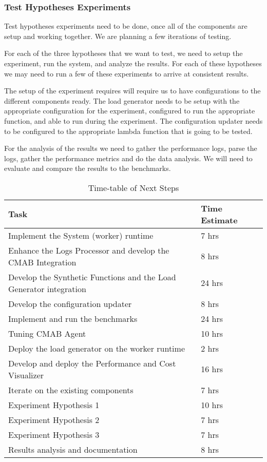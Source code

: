 \documentclass[conference]{IEEEtran}
\begin{document}
\subsubsection{Test Hypotheses Experiments}

Test hypotheses experiments need to be done, once all of the components are setup and working together. We are planning a few iterations of testing.

For each of the three hypotheses that we want to test, we need to setup the experiment, run the system, and analyze the results. For each of these hypotheses we may need to run a few of these experiments to arrive at consistent results.

The setup of the experiment requires will require us to have configurations to the different components ready. The load generator needs to be setup with the appropriate configuration for the experiment, configured to run the appropriate function, and able to run during the experiment. The configuration updater needs to be configured to the appropriate lambda function that is going to be tested.

For the analysis of the results we need to gather the performance logs, parse the logs, gather the performance metrics and do the data analysis. We will need to evaluate and compare the results to the benchmarks.

\begin{table*}[h]
    \centering
    \begin{tabular}{| l | l |}
        \hline Task & Time Estimate\ \\
        \hline Implement the System (worker) runtime & 7 hrs \\
        \hline Enhance the Logs Processor and develop the CMAB Integration & 8 hrs \\
        \hline Develop the Synthetic Functions and the Load Generator integration & 24 hrs \\
        \hline Develop the configuration updater & 8 hrs \\
        \hline Implement and run the benchmarks & 24 hrs \\
        \hline Tuning CMAB Agent & 10 hrs \\
        \hline Deploy the load generator on the worker runtime & 2 hrs \\
        \hline Develop and deploy the Performance and Cost Visualizer & 16 hrs \\
        \hline Iterate on the existing components & 7 hrs \\
        \hline Experiment Hypothesis 1 & 10 hrs \\
        \hline Experiment Hypothesis 2 & 7 hrs \\
        \hline Experiment Hypothesis 3 & 7 hrs \\
        \hline Results analysis and documentation & 8 hrs \\
        \hline
    \end{tabular}
    \caption{Time-table of Next Steps}
    \label{table: t3}
\end{table*}
\end{document}
